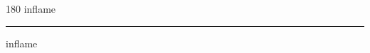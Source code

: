 
\begin{frame}
\begin{center}
\begin{turn}{180}
{\fontsize{2.5cm}{1em}\selectfont inflame}
\end{turn}
\vspace{1em}\par  
\hrule
\vspace{1em}\par  
{\fontsize{2.5cm}{1em}\selectfont inflame}
\end{center}
\end{frame}
